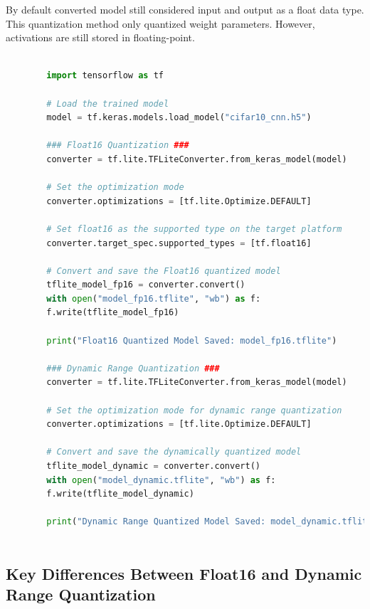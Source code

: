 By default converted model still considered input and output as a float data type. This quantization method only quantized weight parameters. However, activations are still stored in floating-point.
	\begin{lstlisting}[language=Python, caption=TensorFlow Quantization for Model Conversion,style=pythonstyle, label={lst:float_quantization}]
	
		import tensorflow as tf
	
		# Load the trained model
		model = tf.keras.models.load_model("cifar10_cnn.h5")
		
		### Float16 Quantization ###
		converter = tf.lite.TFLiteConverter.from_keras_model(model)
	
		# Set the optimization mode
		converter.optimizations = [tf.lite.Optimize.DEFAULT]
	
		# Set float16 as the supported type on the target platform
		converter.target_spec.supported_types = [tf.float16]
	
		# Convert and save the Float16 quantized model
		tflite_model_fp16 = converter.convert()
		with open("model_fp16.tflite", "wb") as f:
		f.write(tflite_model_fp16)
	
		print("Float16 Quantized Model Saved: model_fp16.tflite")
	
		### Dynamic Range Quantization ###
		converter = tf.lite.TFLiteConverter.from_keras_model(model)
	
		# Set the optimization mode for dynamic range quantization
		converter.optimizations = [tf.lite.Optimize.DEFAULT]
	
		# Convert and save the dynamically quantized model
		tflite_model_dynamic = converter.convert()
		with open("model_dynamic.tflite", "wb") as f:
		f.write(tflite_model_dynamic)
	
		print("Dynamic Range Quantized Model Saved: model_dynamic.tflite")
	
	\end{lstlisting}
	
	\subsection{Key Differences Between Float16 and Dynamic Range Quantization}
	
